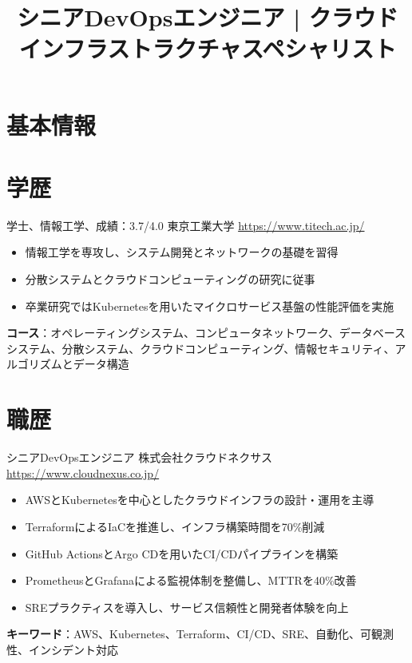\documentclass[a4paper, serif, 10pt]{moderncv}
\title{シニアDevOpsエンジニア | クラウドインフラストラクチャスペシャリスト}
\begin{document}
\maketitle

\section{基本情報}

\section{学歴}

        {学士、情報工学、成績：3.7/4.0}
        {東京工業大学}
        {\url{https://www.titech.ac.jp/}}
        {}
        {\begin{itemize}
\item 情報工学を専攻し、システム開発とネットワークの基礎を習得
\item 分散システムとクラウドコンピューティングの研究に従事
\item 卒業研究ではKubernetesを用いたマイクロサービス基盤の性能評価を実施
\end{itemize}
\textbf{コース}：オペレーティングシステム、コンピュータネットワーク、データベースシステム、分散システム、クラウドコンピューティング、情報セキュリティ、アルゴリズムとデータ構造}
\section{職歴}

        {シニアDevOpsエンジニア}
        {株式会社クラウドネクサス}
        {\url{https://www.cloudnexus.co.jp/}}
        {}
        {\begin{itemize}
\item AWSとKubernetesを中心としたクラウドインフラの設計・運用を主導
\item TerraformによるIaCを推進し、インフラ構築時間を70\%削減
\item GitHub ActionsとArgo CDを用いたCI/CDパイプラインを構築
\item PrometheusとGrafanaによる監視体制を整備し、MTTRを40\%改善
\item SREプラクティスを導入し、サービス信頼性と開発者体験を向上
\end{itemize}
\textbf{キーワード}：AWS、Kubernetes、Terraform、CI/CD、SRE、自動化、可観測性、インシデント対応}
\end{document}
